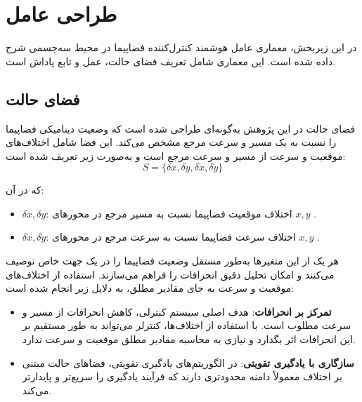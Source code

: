 	\section{طراحی عامل}\label{sec:agent_design}

در این زیربخش، معماری عامل هوشمند کنترل‌کننده فضاپیما در محیط سه‌جسمی شرح داده شده است. این معماری شامل تعریف فضای حالت، عمل و تابع پاداش است.


\subsection{ فضای حالت}

فضای حالت
در این پژوهش به‌گونه‌ای طراحی شده است که وضعیت دینامیکی فضاپیما را نسبت به یک مسیر و سرعت مرجع مشخص می‌کند. این فضا شامل اختلاف‌های موقعیت و سرعت از مسیر و سرعت مرجع  است و به‌صورت زیر تعریف شده است:
\[
S = \{ \delta x, \delta y, \delta \dot{x}, \delta \dot{y} \}
\]

که در آن:
\begin{itemize}
	\item \( \delta x, \delta y \): اختلاف موقعیت فضاپیما نسبت به مسیر مرجع در محورهای \( x, y \) .
	\item \( \delta \dot{x}, \delta \dot{y} \): اختلاف سرعت فضاپیما نسبت به سرعت مرجع در محورهای \( x, y \) .
\end{itemize}

هر یک از این متغیرها به‌طور مستقل وضعیت فضاپیما را در یک جهت خاص توصیف می‌کنند و امکان تحلیل دقیق انحرافات را فراهم می‌سازند.
استفاده از اختلاف‌های موقعیت و سرعت به جای مقادیر مطلق، به دلایل زیر انجام شده است:
\begin{itemize}
	\item \textbf{تمرکز بر انحرافات}: هدف اصلی سیستم کنترلی، کاهش انحرافات از مسیر و سرعت مطلوب است. با استفاده از اختلاف‌ها، کنترلر می‌تواند به طور مستقیم بر این انحرافات اثر بگذارد و نیازی به محاسبه مقادیر مطلق موقعیت و سرعت ندارد.
	\item \textbf{سازگاری با یادگیری تقویتی}: در الگوریتم‌های یادگیری تقویتی، فضاهای حالت مبتنی بر اختلاف معمولاً دامنه محدودتری دارند که فرآیند یادگیری را سریع‌تر و پایدارتر می‌کند.
\end{itemize}


